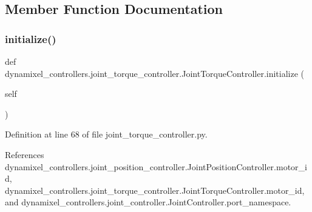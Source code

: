 \subsection{Member Function Documentation}
\mbox{\label{classdynamixel__controllers_1_1joint__torque__controller_1_1_joint_torque_controller_aa8caaf49515f747d5d4142b07be803f5}} 
\subsubsection{\texorpdfstring{initialize()}{initialize()}}
{\footnotesize\ttfamily def dynamixel\+\_\+controllers.\+joint\+\_\+torque\+\_\+controller.\+Joint\+Torque\+Controller.\+initialize (\begin{DoxyParamCaption}\item[{}]{self }\end{DoxyParamCaption})}



Definition at line 68 of file joint\+\_\+torque\+\_\+controller.\+py.



References dynamixel\+\_\+controllers.\+joint\+\_\+position\+\_\+controller.\+Joint\+Position\+Controller.\+motor\+\_\+id, dynamixel\+\_\+controllers.\+joint\+\_\+torque\+\_\+controller.\+Joint\+Torque\+Controller.\+motor\+\_\+id, and dynamixel\+\_\+controllers.\+joint\+\_\+controller.\+Joint\+Controller.\+port\+\_\+namespace.


